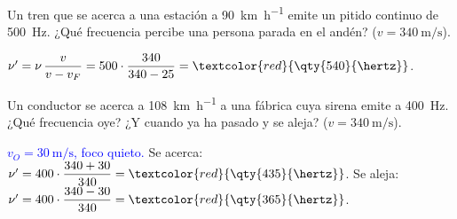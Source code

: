 \begin{exercise}
    Un tren que se acerca a una estación a \qty{90}{\km\per\hour} emite un pitido continuo de \qty{500}{\hertz}. ¿Qué
    frecuencia percibe una persona parada en el andén? (\(v = \qty{340}{\m\per\second}\)).
    \begin{solu}
        \(\nu' = \nu\,\dfrac{v}{v - v_F} = 500\cdot\dfrac{340}{340 - 25} = \textcolor{red}{\qty{540}{\hertz}}\).
    \end{solu}
\end{exercise}

\begin{exercise}
    Un conductor se acerca a \qty{108}{\km\per\hour} a una fábrica cuya sirena emite a \qty{400}{\hertz}. ¿Qué frecuencia oye?
    ¿Y cuando ya ha pasado y se aleja? (\(v = \qty{340}{\m\per\second}\)).
    \begin{solu}
        \textcolor{blue}{\(v_O = \qty{30}{\m\per\second}\), foco quieto.}
        Se acerca: \(\nu' = 400\cdot\dfrac{340 + 30}{340} = \textcolor{red}{\qty{435}{\hertz}}\).
        Se aleja: \(\nu' = 400\cdot\dfrac{340 - 30}{340} = \textcolor{red}{\qty{365}{\hertz}}\).
    \end{solu}
\end{exercise}
